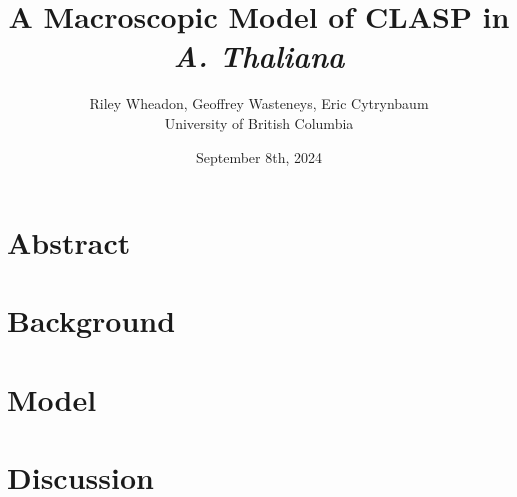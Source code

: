 \documentclass[11pt, oneside]{article}
\begin{document}
\title{A Macroscopic Model of CLASP in \emph{A. Thaliana}}
\author{Riley Wheadon, Geoffrey Wasteneys, Eric Cytrynbaum \\ University of British Columbia}
\date{September 8th, 2024}
\maketitle

\section{Abstract}



\newpage

\section{Background}



\newpage

\section{Model}







\newpage

\section{Discussion}



\newpage
\printbibliography
\end{document}
